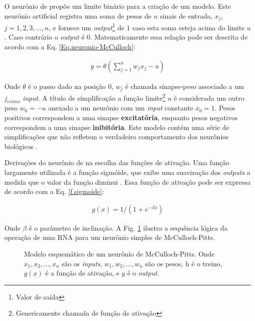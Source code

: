 O neurônio de \citet{McCulloch1943} propõe um limite binário para a criação de um modelo. Este neurônio artificial registra uma soma de pesos de $n$ sinais de entrada, $x_{j}$, $j=1,2,3,...,n$, e fornece um \textit{output}\footnote{Valor de saída} de $1$ caso esta soma esteja acima do limite $u$. Caso contrário o \textit{output} é $0$. Matematicamente essa relação pode ser descrita de acordo com a Eq. \ref{Eq.neuronio-McCulloch}:

\begin{eqnarray}
y=\theta \left( \sum^{n}_{j=1} w_{j} x_{j} -u \right)
\label{Eq.neuronio-McCulloch}
\end{eqnarray}

Onde $\theta$ é o passo dado na posição $0$, $w_{j}$ é chamada sinapse-peso associado a um $j_{esimo}$ \textit{input}. A título de simplificação a função limite\footnote{Genericamente chamada de função de ativação} $u$ é considerada um outro peso $w_{0}=-u$ anexado a um neurônio com um \textit{input} constante $x_{0}=1$. Pesos positivos correspondem a uma sinapse \textbf{excitatória}, enquanto pesos negativos correspondem a uma sinapse \textbf{inibitória}. Este modelo contém uma série de simplificações que não refletem o verdadeiro comportamento dos neurônios biológicos \citep{Mao1996}.  

Derivações do neurônio de \citet{McCulloch1943} na escolha das funções de ativação. Uma função largamente utilizada é a função sigmóide, que exibe uma suavização dos \textit{outputs} a medida que o valor da função diminui \citep{Mao1996,Misra2010}. Essa função de ativação pode ser expressa de acordo com a Eq. \ref{f.sigmoide}:

\begin{eqnarray}
g(x)=1/(1+e^{-\beta x})
\label{f.sigmoide}
\end{eqnarray}

Onde $\beta$ é o parâmetro de inclinação. A Fig. \ref{Esquematico de McCulloch} ilustra a sequência lógica da operação de uma RNA para um neurônio simples de McCulloch-Pitts. 
\\
\begin{figure}[H]
	\centering
	\setlength{\fboxsep}{8pt}
	\setlength{\fboxrule}{0.1pt}
	\caption{Modelo esquemático de um neurônio de McCulloch-Pitts. Onde $x_{1}, x_{2}, ..., x_{n}$ são os \textit{inputs}, $w_{1}, w_{2}, ..., w_{n}$ são os pesos, h é o treino, $g(x)$ é a função de ativação, e $y$ é o \textit{output}.}
	\label{Esquematico de McCulloch}
\end{figure}

